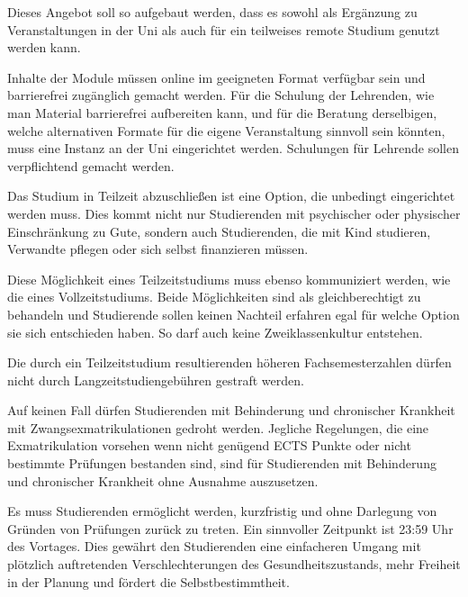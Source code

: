 \documentclass[DIV=calc]{scrartcl}
\begin{document}
Dieses Angebot soll so aufgebaut werden, dass es sowohl als Ergänzung zu Veranstaltungen in der Uni als auch für ein teilweises remote Studium genutzt werden kann.

Inhalte der Module müssen online im geeigneten Format verfügbar sein und barrierefrei zugänglich gemacht werden. 
Für die Schulung der Lehrenden, wie man Material barrierefrei aufbereiten kann, und für die Beratung derselbigen, welche alternativen Formate für die eigene Veranstaltung sinnvoll sein könnten, muss eine Instanz an der Uni eingerichtet werden. Schulungen für Lehrende sollen verpflichtend gemacht werden.

Das Studium in Teilzeit abzuschließen ist eine Option, die unbedingt eingerichtet werden muss. Dies kommt nicht nur Studierenden mit psychischer oder physischer Einschränkung zu Gute, sondern auch Studierenden, die mit Kind studieren, Verwandte pflegen oder sich selbst finanzieren müssen.

Diese Möglichkeit eines Teilzeitstudiums muss ebenso kommuniziert werden, wie die eines Vollzeitstudiums. Beide Möglichkeiten sind als gleichberechtigt zu behandeln und Studierende sollen keinen Nachteil erfahren egal für welche Option sie sich entschieden haben. So darf auch keine Zweiklassenkultur entstehen.

Die durch ein Teilzeitstudium resultierenden höheren Fachsemesterzahlen dürfen nicht durch Langzeitstudiengebühren gestraft werden.

Auf keinen Fall dürfen Studierenden mit Behinderung und chronischer Krankheit mit Zwangsexmatrikulationen gedroht werden. Jegliche Regelungen, die eine Exmatrikulation vorsehen wenn nicht genügend ECTS Punkte oder nicht bestimmte Prüfungen bestanden sind, sind für Studierenden mit Behinderung und chronischer Krankheit ohne Ausnahme auszusetzen.

Es muss Studierenden ermöglicht werden, kurzfristig und ohne Darlegung von Gründen von Prüfungen zurück zu treten. Ein sinnvoller Zeitpunkt ist 23:59 Uhr des Vortages. 
Dies gewährt den Studierenden eine einfacheren Umgang mit plötzlich  auftretenden Verschlechterungen des Gesundheitszustands, mehr Freiheit in der Planung und fördert die Selbstbestimmtheit.
\end{document}
